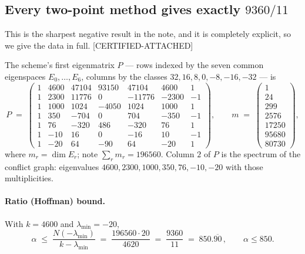\documentclass[10pt,a4paper]{article}
\newcommand{\CA}{\textsf{[CERTIFIED-ATTACHED]}}
\begin{document}
\subsection{Every two-point method gives exactly $9360/11$}\label{sec:twopoint}

This is the sharpest negative result in the note, and it is completely explicit, so we give the
data in full. \CA

The scheme's first eigenmatrix $P$ --- rows indexed by the seven common eigenspaces
$E_0,\dots,E_6$, columns by the classes $32,16,8,0,-8,-16,-32$ --- is
\[
P \;=\;
\begin{pmatrix}
1 & 4600 & 47104 & 93150 & 47104 & 4600 & 1\\
1 & 2300 & 11776 & 0 & -11776 & -2300 & -1\\
1 & 1000 & 1024 & -4050 & 1024 & 1000 & 1\\
1 & 350 & -704 & 0 & 704 & -350 & -1\\
1 & 76 & -320 & 486 & -320 & 76 & 1\\
1 & -10 & 16 & 0 & -16 & 10 & -1\\
1 & -20 & 64 & -90 & 64 & -20 & 1
\end{pmatrix},
\qquad
m \;=\;
\begin{pmatrix}
1\\ 24\\ 299\\ 2576\\ 17250\\ 95680\\ 80730
\end{pmatrix},
\]
where $m_r = \dim E_r$; note $\sum_r m_r = 196560$. Column $2$ of $P$ is the spectrum of the
conflict graph: eigenvalues $4600, 2300, 1000, 350, 76, -10, -20$ with those multiplicities.

\paragraph{Ratio (Hoffman) bound.} With $k = 4600$ and $\lambda_{\min} = -20$,
\[
  \alpha \;\le\; \frac{N(-\lambda_{\min})}{k - \lambda_{\min}}
  \;=\; \frac{196560 \cdot 20}{4620} \;=\; \frac{9360}{11} \;=\; 850.\overline{90}\,,
  \qquad \alpha \le 850 .
\]
\end{document}
